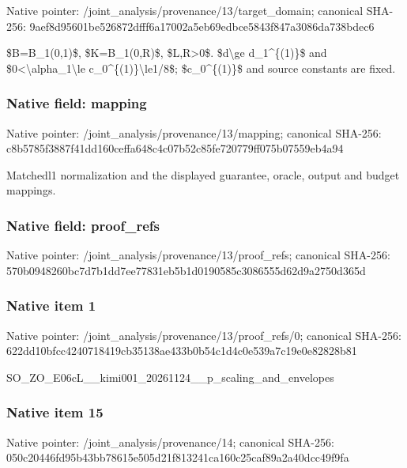 \documentclass[10pt,a4paper]{article}
\begin{document}
Native pointer: /joint\_analysis/provenan\allowbreak{}ce/13/target\_domain; canonical SHA-256: 9aef8d95601be526872dfff6\allowbreak{}a17002a5eb69edbce5843f84\allowbreak{}7a3086da738bdec6


\$B=B\_1(0,1)\$, \$K=B\_1(0,R)\$, \$L,R>0\$. \$d\textbackslash{}ge d\_1\textasciicircum{}\{(1)\}\$ and \$0<\textbackslash{}alpha\_1\textbackslash{}le c\_0\textasciicircum{}\{(1)\}\textbackslash{}le1/8\$; \$c\_0\textasciicircum{}\{(1)\}\$ and source constants are fixed.


\subsubsection{Native field: mapping}


Native pointer: /joint\_analysis/provenance/13/mapping; canonical SHA-256: c8b5785f3887f41dd160ceff\allowbreak{}a648c4c07b52c85fe720779f\allowbreak{}f075b07559eb4a94


Matchedl1 normalization and the displayed guarantee, oracle, output and budget mappings.


\subsubsection{Native field: proof\_refs}


Native pointer: /joint\_analysis/provenan\allowbreak{}ce/13/proof\_refs; canonical SHA-256: 570b0948260bc7d7b1dd7ee7\allowbreak{}7831eb5b1d0190585c308655\allowbreak{}5d62d9a2750d365d



\subsubsection{Native item 1}


Native pointer: /joint\_analysis/provenan\allowbreak{}ce/13/proof\_refs/0; canonical SHA-256: 622dd10bfcc4240718419cb3\allowbreak{}5138ae433b0b54c1d4c0e539\allowbreak{}a7c19e0e82828b81


SO\_ZO\_E06cL\_\_kimi001\_202\allowbreak{}61124\_\_p\_scaling\_and\_env\allowbreak{}elopes


\subsubsection{Native item 15}


Native pointer: /joint\_analysis/provenance/14; canonical SHA-256: 050c20446fd95b43bb78615e\allowbreak{}505d21f813241ca160c25caf\allowbreak{}89a2a40dcc49f9fa
\end{document}
